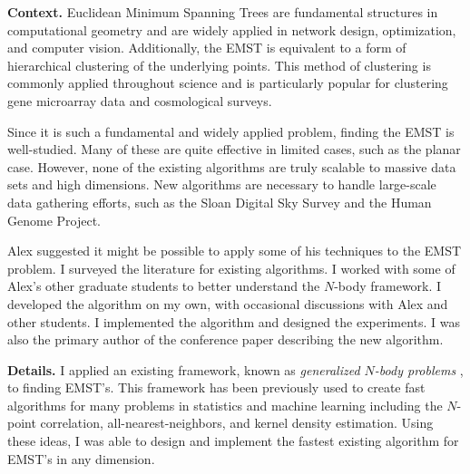 \documentclass[twoside,leqno, 12pt]{article}
\begin{document}
\textbf{Context.}
Euclidean Minimum Spanning Trees are fundamental structures in computational geometry and are widely applied in network design, optimization, and computer vision.  Additionally, the EMST is equivalent to a form of hierarchical clustering of the underlying points.  This method of clustering is commonly applied throughout science and is particularly popular for clustering gene microarray data and cosmological surveys.  

Since it is such a fundamental and widely applied problem, finding the EMST is well-studied.  Many of these are quite effective in limited cases, such as the planar case.  However, none of the existing algorithms are truly scalable to massive data sets and high dimensions.  New algorithms are necessary to handle large-scale data gathering efforts, such as the Sloan Digital Sky Survey and the Human Genome Project.

Alex suggested it might be possible to apply some of his techniques to the EMST problem.  I surveyed the literature for existing algorithms.  I worked with some of Alex's other graduate students to better understand the $N$-body framework.  I developed the algorithm on my own, with occasional discussions with Alex and other students.  I implemented the algorithm and designed the experiments.  I was also the primary author of the conference paper describing the new algorithm.  


%


\textbf{Details.}  I applied an existing framework, known as \emph{generalized $N$-body problems} \cite{gray_nbody}, to finding EMST's.  This framework has been previously used to create fast algorithms for many problems in statistics and machine learning including the $N$-point correlation, all-nearest-neighbors, and kernel density estimation.  Using these ideas, I was able to design and implement the fastest existing algorithm for EMST's in any dimension.  
\end{document}
